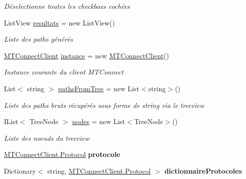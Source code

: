 \begin{DoxyCompactItemize}
\begin{DoxyCompactList}\small\item\em Déselectionne toutes les checkboxs cochées \end{DoxyCompactList}\item 
List\+View \mbox{\hyperlink{class_m_t_connect_agent_1_1_user_control_display_tab_a246386326d94ef712378b72727570995}{resultats}} = new List\+View()
\begin{DoxyCompactList}\small\item\em Liste des paths générés \end{DoxyCompactList}\item 
\mbox{\hyperlink{class_m_t_connect_agent_1_1_b_l_l_1_1_m_t_connect_client}{M\+T\+Connect\+Client}} \mbox{\hyperlink{class_m_t_connect_agent_1_1_user_control_display_tab_a4bfdc2032bbe24566e9e4d7053438ab1}{instance}} = new \mbox{\hyperlink{class_m_t_connect_agent_1_1_b_l_l_1_1_m_t_connect_client}{M\+T\+Connect\+Client}}()
\begin{DoxyCompactList}\small\item\em Instance courante du client M\+T\+Connect \end{DoxyCompactList}\item 
List$<$ string $>$ \mbox{\hyperlink{class_m_t_connect_agent_1_1_user_control_display_tab_aefd62ca9c1f8ff816f6208332ae4860e}{paths\+From\+Tree}} = new List$<$string$>$()
\begin{DoxyCompactList}\small\item\em Liste des paths bruts récupérés sous forme de string via le treeview \end{DoxyCompactList}\item 
I\+List$<$ Tree\+Node $>$ \mbox{\hyperlink{class_m_t_connect_agent_1_1_user_control_display_tab_a70ccdb75ebd47abf8cf75656c5318492}{nodes}} = new List$<$Tree\+Node$>$()
\begin{DoxyCompactList}\small\item\em Liste des noeuds du treeview \end{DoxyCompactList}\item 
\mbox{\label{class_m_t_connect_agent_1_1_user_control_display_tab_a3471dd7677ae1037fe9319383ef5ccbd}} 
\mbox{\hyperlink{class_m_t_connect_agent_1_1_b_l_l_1_1_m_t_connect_client_a2f390f74a0ad3ee5147e9438ceed6474}{M\+T\+Connect\+Client.\+Protocol}} {\bfseries protocole}
\item 
Dictionary$<$ string, \mbox{\hyperlink{class_m_t_connect_agent_1_1_b_l_l_1_1_m_t_connect_client_a2f390f74a0ad3ee5147e9438ceed6474}{M\+T\+Connect\+Client.\+Protocol}} $>$ {\bfseries dictionnaire\+Protocoles}

\end{DoxyCompactItemize}
